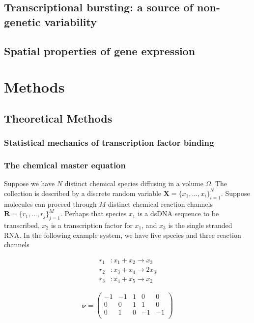 \documentclass{article}
\begin{document}
\subsection{Transcriptional bursting: a source of non-genetic variability}

\subsection{Spatial properties of gene expression}

\section{Methods}

\subsection{Theoretical Methods}

\subsubsection{Statistical mechanics of transcription factor binding}

\subsubsection{The chemical master equation}

Suppose we have $N$ distinct chemical species diffusing in a volume $\Omega$. The collection is described by a discrete random variable $\mathbf{X} = \{x_{1},...,x_{i}\}_{i=1}^{N}$. Suppose molecules can proceed through $M$ distinct chemical reaction channels $\mathbf{R} =  \{r_{1},...,r_{j}\}_{j=1}^{M}$. Perhaps that species $x_{1}$ is a dsDNA sequence to be transcribed, $x_{2}$ is a transcription factor for $x_{1}$, and $x_{3}$ is the single stranded RNA. In the following example system, we have five species and three reaction channels


\begin{center}
\noindent\begin{minipage}{.25\linewidth}
\begin{align*}
r_{1}&: x_{1} + x_{2} \rightarrow x_{3}\\
r_{2}&: x_{3} + x_{4} \rightarrow 2x_{3}\\
r_{3}&: x_{4} + x_{5} \rightarrow x_{2}
\end{align*}
\end{minipage}%
\begin{minipage}{.25\linewidth}
\begin{align*}
\mathbf{\nu} = \begin{pmatrix}
-1 & -1 & 1 & 0 & 0\\
0 & 0 & 1 & 1 & 0\\
0 & 1 & 0 & -1 & -1\\
\end{pmatrix}
\end{align*}
\end{minipage}
\end{center}
\end{document}
